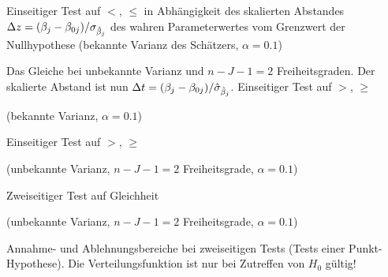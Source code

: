 \begin{landscape}
\begin{center}
\newpage
\parbox{1.1\textwidth}{Einseitiger Test auf $<$, $\le$ in
Abh\"angigkeit des skalierten Abstandes $\Delta
z=(\beta_j-\beta_{0j})/\sigma_{\hat{\beta}_j}$ des wahren Parameterwertes vom
Grenzwert der Nullhypothese (bekannte Varianz des Sch\"atzers, $\alpha=0.1$)
}
\newpage
Das Gleiche bei unbekannte Varianz und $n-J-1=2$ Freiheitsgraden. Der 
skalierte Abstand ist nun $\Delta
t=(\beta_j-\beta_{0j})/\hat{\sigma}_{\hat{\beta}_j}$.
\newpage
 Einseitiger Test auf $>$, $\ge$ 

(bekannte Varianz, $\alpha=0.1$)

\newpage
 Einseitiger Test auf $>$, $\ge$

 (unbekannte Varianz, $n-J-1=2$ Freiheitsgrade, $\alpha=0.1$)

\newpage
Zweiseitiger Test auf Gleichheit

 (unbekannte Varianz, $n-J-1=2$ Freiheitsgrade, $\alpha=0.1$)


\newpage

\vspace{2em}

Annahme- und Ablehnungsbereiche
bei zweiseitigen Tests (Tests einer Punkt-Hypothese). Die
Verteilungsfunktion ist nur bei Zutreffen von $H_0$ g\"ultig!



\end{center}
\end{landscape}
